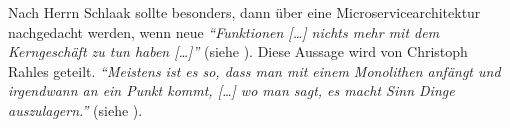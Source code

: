 Nach Herrn Schlaak sollte besonders, dann über eine Microservicearchitektur nachgedacht werden, wenn neue \textit{\enquote{Funktionen […] nichts mehr mit dem Kerngeschäft zu tun haben […]}} (siehe ). Diese Aussage wird von Christoph Rahles geteilt. \textit{\enquote{Meistens ist es so, dass man mit einem Monolithen anfängt und irgendwann an ein Punkt kommt, […] wo man sagt, es macht Sinn Dinge auszulagern.}} (siehe ).

